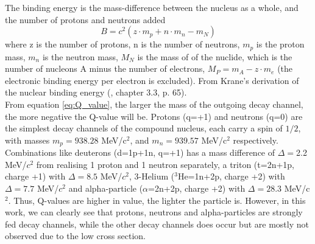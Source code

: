 
The binding energy is the mass-difference between the nucleus as a whole, and the number of protons and neutrons added
\begin{equation} \label{eq:Binding_energy1}
    B = c^2(z\cdot m_p + n \cdot m_n - m_N)
\end{equation}
\noindent where z is the number of protons, n is the number of neutrons, $m_p$ is the proton mass, $m_n$ is the neutron mass, $M_N$ is the mass of of the nuclide, which is the number of nucleons A minus the number of electrons, $M_P = m_A - z\cdot m_e$ (the electronic binding energy per electron is excluded). From Krane's derivation of the nuclear binding energy (\cite{KraneKennethS.Halliday1987}, chapter 3.3, p. 65). \\

From equation \ref{eq:Q_value}, the larger the mass of the outgoing decay channel, the more negative the Q-value will be. Protons (q=+1) and neutrons (q=0) are the simplest decay channels of the compound nucleus, each carry a spin of $1/2$, with masses $m_p=938.28$ MeV/c$^2$, and $m_n=939.57$ MeV/c$^2$ respectively. Combinations like deuterons (d=1p+1n, q=+1) has a mass difference of $\Delta=$2.2 MeV/$c^2$ from realising 1 proton and 1 neutron separately, a triton (t=2n+1p, charge +1) with $\Delta=8.5$ MeV/$c^2$,  3-Helium ($^{3}$He=1n+2p, charge +2) with $\Delta=7.7$ MeV/$c^2$ and alpha-particle ($\alpha$=2n+2p, charge +2) with $\Delta=28.3$ MeV/c$^2$. Thus, Q-values are higher in value, the lighter the particle is. However, in this work, we can clearly see that protons, neutrons and alpha-particles are strongly fed decay channels, while the other decay channels does occur but are mostly not observed due to the low cross section. %

